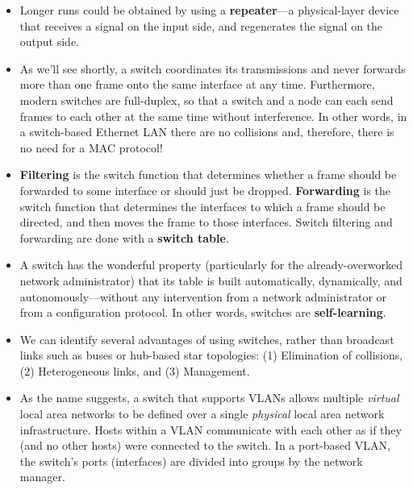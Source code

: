 \begin{itemize}
\item
Longer runs could be obtained by using a \textbf{repeater}---a physical-layer device that receives a signal on the input side, and regenerates the signal on the output side.

\item
As we'll see shortly, a switch coordinates its transmissions and never forwards more than one frame onto the same interface at any time. Furthermore, modern switches are full-duplex, so that a switch and a node can each send frames to each other at the same time without interference. In other words, in a switch-based Ethernet LAN there are no collisions and, therefore, there is no need for a MAC protocol!

\item
\textbf{Filtering} is the switch function that determines whether a frame should be forwarded to some interface or should just be dropped. \textbf{Forwarding} is the switch function that determines the interfaces to which a frame should be directed, and then moves the frame to those interfaces. Switch filtering and forwarding are done with a \textbf{switch table}.

\item
A switch has the wonderful property (particularly for the already-overworked network administrator) that its table is built automatically, dynamically, and autonomously---without any intervention from a network administrator or from a configuration protocol. In other words, switches are \textbf{self-learning}.

\item
We can identify several advantages of using switches, rather than broadcast links such as buses or hub-based star topologies: (1) Elimination of collisions, (2) Heterogeneous links, and (3) Management.

\item
As the name suggests, a switch that supports VLANs allows multiple \textit{virtual} local area networks to be defined over a single \textit{physical} local area network infrastructure. Hosts within a VLAN communicate with each other as if they (and no other hosts) were connected to the switch. In a port-based VLAN, the switch's ports (interfaces) are divided into groups by the network manager.\\


\end{itemize}

